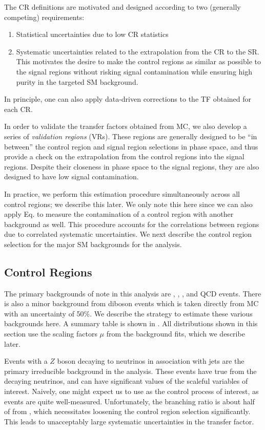 The CR definitions are motivated and designed according to two (generally competing) requirements:
\begin{enumerate}
\item Statistical uncertainties due to low CR statistics
\item Systematic uncertainties related to the extrapolation from the CR to the SR.  This motivates the desire to make the control regions as similar as possible to the signal regions without risking signal contamination while ensuring high purity in the targeted SM background.
\end{enumerate}
In principle, one can also apply data-driven corrections to the TF obtained for each CR.

In order to validate the transfer factors obtained from MC, we also develop a series of \textit{validation regions} (VRs).
These regions are generally designed to be ``in between'' the control region and signal region selections in phase space, and thus provide a check on the extrapolation from the control regions into the signal regions.
Despite their closeness in phase space to the signal regions, they are also designed to have low signal contamination.

In practice, we perform this estimation procedure simultaneously across all control regions; we describe this later.
We only note this here since we can also apply Eq. to measure the contamination of a control region with another background as well.
This procedure accounts for the correlations between regions due to correlated systematic uncertainties.
We next describe the control region selection for the major SM backgrounds for the analysis.

\subsection{Control Regions}

The primary backgrounds of note in this analysis are \zjets, \wjets, \ttbar, and QCD events.
There is also a minor background from diboson events which is taken directly from MC with an uncertainty of 50\%.
We describe the strategy to estimate these various backgrounds here.
A summary table is shown in .
All distributions shown in this section use the scaling factors $\mu$ from the background fits, which we describe later.


Events with a $Z$ boson decaying to neutrinos in association with jets are the primary irreducible background in the analysis.
These events have true \met from the decaying neutrinos, and can have significant values of the scaleful variables of interest.
Naively, one might expect us to use \Zll as the control process of interest, as \Zll events are quite well-measured.
Unfortunately, the \Zll branching ratio is about half of from \Zvv, which necessitates loosening the control region selection significantly.
This leads to unacceptably large systematic uncertainties in the transfer factor.

